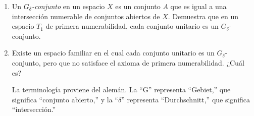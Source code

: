 

\item 
    \begin{enumerate}
        \item Un \textit{$G_{\delta}$-conjunto} en un espacio $X$ es un conjunto $A$ que es igual a una intersección numerable de conjuntos abiertos de $X$. Demuestra que en un espacio $T_1$ de primera numerabilidad, cada conjunto unitario es un $G_{\delta}$-conjunto.
        \item Existe un espacio familiar en el cual cada conjunto unitario es un $G_{\delta}$-conjunto, pero que no satisface el axioma de primera numerabilidad. ¿Cuál es?  
        
        La terminología proviene del alemán. La ``G'' representa ``Gebiet,'' que significa ``conjunto abierto,'' y la ``$\delta$'' representa ``Durchschnitt,'' que significa ``intersección.''
    \end{enumerate}